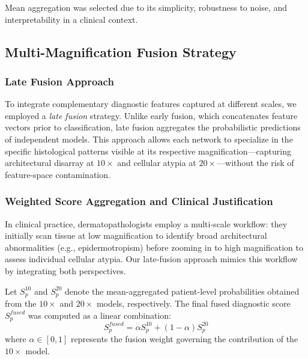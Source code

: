 \documentclass[conference]{IEEEtran}
\begin{document}
Mean aggregation was selected due to its simplicity, robustness to noise, and interpretability in a clinical context.

\subsection{Multi-Magnification Fusion Strategy}

\subsubsection{Late Fusion Approach}
To integrate complementary diagnostic features captured at different scales, we employed a \textit{late fusion} strategy. Unlike early fusion, which concatenates feature vectors prior to classification, late fusion aggregates the probabilistic predictions of independent models. This approach allows each network to specialize in the specific histological patterns visible at its respective magnification—capturing architectural disarray at $10\times$ and cellular atypia at $20\times$—without the risk of feature-space contamination.

\subsubsection{Weighted Score Aggregation and Clinical Justification}
In clinical practice, dermatopathologists employ a multi-scale workflow: they initially scan tissue at low magnification to identify broad architectural abnormalities (e.g., epidermotropism) before zooming in to high magnification to assess individual cellular atypia. Our late-fusion approach mimics this workflow by integrating both perspectives. 

Let $S_{p}^{10}$ and $S_{p}^{20}$ denote the mean-aggregated patient-level probabilities obtained from the $10\times$ and $20\times$ models, respectively. The final fused diagnostic score $S_{p}^{fused}$ was computed as a linear combination:
\begin{equation}
S_{p}^{fused} = \alpha S_{p}^{10} + (1 - \alpha) S_{p}^{20}
\end{equation}
where $\alpha \in [0, 1]$ represents the fusion weight governing the contribution of the $10\times$ model.
\end{document}
